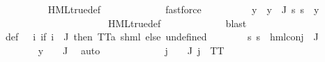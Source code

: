 \begin{isabellebody}
\ \ \ \ \ \ \ \ \ \ \isamarkupfalse%
\ HML{\isacharunderscore}{\kern0pt}true{\isacharunderscore}{\kern0pt}def\ \isanewline
\ \ \ \ \ \ \ \ \ \ \isamarkupfalse%
\ fastforce\isanewline
\ \ \ \ \ \ \ \ \isamarkupfalse%
\ y\ \ {\isachardoublequoteopen}y\ {\isasymin}\ {\isasymPhi}{\isacharbackquote}{\kern0pt}J{\isachardoublequoteclose}\ {\isachardoublequoteopen}{\isacharparenleft}{\kern0pt}{\isasymforall}s{\isachardot}{\kern0pt}\ s\ {\isasymTurnstile}\ y{\isacharparenright}{\kern0pt}{\isachardoublequoteclose}\ \isanewline
\ \ \ \ \ \ \ \ \ \ \isamarkupfalse%
\ {\isachardoublequoteopen}{}{\isachardoublequoteclose}\isanewline
\ \ \ \ \ \ \ \ \ \ \isamarkupfalse%
\ HML{\isacharunderscore}{\kern0pt}true{\isacharunderscore}{\kern0pt}def\ \isanewline
\ \ \ \ \ \ \ \ \ \ \isamarkupfalse%
\ blast\isanewline
\ \ \ \ \ \ \isamarkupfalse%
\ {\isasymPsi}\ \ {\isasymPsi}{\isacharunderscore}{\kern0pt}def{\isacharcolon}{\kern0pt}\ {\isachardoublequoteopen}{\isasymPsi}\ {\isacharequal}{\kern0pt}\ {\isacharparenleft}{\kern0pt}{\isasymlambda}i{\isachardot}{\kern0pt}\ {\isacharparenleft}{\kern0pt}if\ i\ {\isasymin}\ J\ then\ {\isacharparenleft}{\kern0pt}TT{\isacharcolon}{\kern0pt}{\isacharcolon}{\kern0pt}{\isacharparenleft}{\kern0pt}{\isacharprime}{\kern0pt}a{\isacharcomma}{\kern0pt}\ {\isacharprime}{\kern0pt}s{\isacharparenright}{\kern0pt}hml{\isacharparenright}{\kern0pt}\ else\ undefined{\isacharparenright}{\kern0pt}{\isacharparenright}{\kern0pt}{\isachardoublequoteclose}\isanewline
\ \ \ \ \ \ \isamarkupfalse%
\ {\isachardoublequoteopen}{\isasymforall}s{\isachardot}{\kern0pt}\ {\isasymnot}s\ {\isasymTurnstile}\ {\isacharparenleft}{\kern0pt}hml{\isacharunderscore}{\kern0pt}conj\ {\isacharbraceleft}{\kern0pt}{\isacharbraceright}{\kern0pt}\ J\ {\isasymPsi}{\isacharparenright}{\kern0pt}{\isachardoublequoteclose}\ \isanewline
\ \ \ \ \ \ \ \ \isamarkupfalse%
\ {\isacartoucheopen}y\ {\isasymin}\ {\isasymPhi}\ {\isacharbackquote}{\kern0pt}\ J{\isacartoucheclose}\ \isamarkupfalse%
\ auto\isanewline
\ \ \ \ \ \ \isamarkupfalse%
\ {\isachardoublequoteopen}{\isasymPsi}\ {\isacharbackquote}{\kern0pt}\ {\isacharbraceleft}{\kern0pt}{\isacharbraceright}{\kern0pt}\ {\isacharequal}{\kern0pt}\ {\isacharbraceleft}{\kern0pt}{\isacharbraceright}{\kern0pt}{\isachardoublequoteclose}\ {\isachardoublequoteopen}{\isasymforall}j\ {\isasymin}\ {\isasymPsi}\ {\isacharbackquote}{\kern0pt}\ J{\isachardot}{\kern0pt}\ j\ {\isacharequal}{\kern0pt}\ TT{\isachardoublequoteclose}\ \isanewline

\end{isabellebody}
